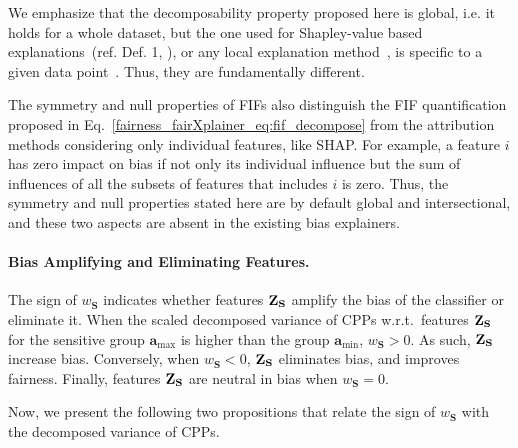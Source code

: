 We emphasize that the decomposability property proposed here is global, i.e. it holds for a whole dataset, but the one used for Shapley-value based explanations~(ref. Def. 1, \cite{lundberg2017unified}), or any local explanation method~\cite{han2022explanation}, is specific to a given data point~\cite{sliwinski2019axiomatic}. Thus, they are fundamentally different.

The symmetry and null properties of FIFs also distinguish the FIF quantification proposed in Eq.~\eqref{fairness_fairXplainer_eq:fif_decompose} from the attribution methods considering only individual features, like SHAP. For example, a feature $i$ has zero impact on bias if not only its individual influence but the sum of influences of all the subsets of features that includes $i$ is zero. Thus, the symmetry and null properties stated here are by default global and intersectional, and these two aspects are absent in the existing bias explainers.

\paragraph{Bias Amplifying and Eliminating Features.} The sign of $ w_{\mathbf{S}} $ indicates whether features $ \mathbf{Z}_{\mathbf{S}} $ amplify the bias of the classifier or eliminate it. When the scaled decomposed variance of CPPs w.r.t.\ features $ \mathbf{Z}_{\mathbf{S}} $ for the sensitive group $ \mathbf{a}_{\max} $ is higher than the group $ \mathbf{a}_{\min} $, $ w_{\mathbf{S}} > 0 $. As such, $ \mathbf{Z}_{\mathbf{S}} $ increase bias. Conversely, when $ w_{\mathbf{S}} < 0 $, $ \mathbf{Z}_{\mathbf{S}} $ eliminates bias, and improves fairness. Finally, features $ \mathbf{Z}_{\mathbf{S}} $ are neutral in bias when $ w_{\mathbf{S}} = 0 $. 

Now, we present the following two propositions that relate the sign of $ w_{\mathbf{S}} $ with the decomposed variance of CPPs.

